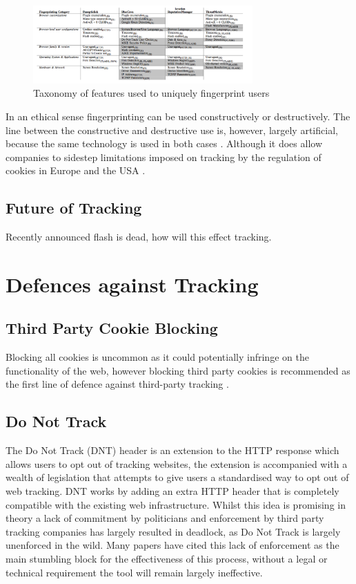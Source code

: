 \documentclass{article}
\begin{document}
\begin{figure}[H]
    \centering
    \includegraphics[width=0.75\textwidth]{fingerprintingConfigs}
    \caption{Taxonomy of features used to uniquely fingerprint users \parencite{cookielessMonster}}
    \label{fig:fingerprintingConfigs}
\end{figure}

In an ethical sense fingerprinting can be used constructively or destructively. The line between the constructive and destructive use is, however, largely artificial, because the same technology is used in both cases \parencite{cookielessMonster}. Although it does allow companies to sidestep limitations imposed on tracking by the regulation of cookies in Europe and the USA \parencite{dustingFP}. 

\subsection{Future of Tracking}
Recently announced flash is dead, how will this effect tracking. 

\section{Defences against Tracking}
\subsection{Third Party Cookie Blocking}
Blocking all cookies is uncommon as it could potentially infringe on the functionality of the web, however blocking third party cookies is recommended as the first line of defence against third-party tracking \parencite{roesner}. 


\subsection{Do Not Track}
The Do Not Track (DNT) header is an extension to the HTTP response which allows users to opt out of tracking websites, the extension is accompanied with a wealth of legislation that attempts to give users a standardised way to opt out of web tracking. DNT works by adding an extra HTTP header that is completely compatible with the existing web infrastructure. Whilst this idea is promising in theory a lack of commitment by politicians and enforcement by third party tracking companies has largely resulted in deadlock, as Do Not Track is largely unenforced in the wild. Many papers have cited this lack of enforcement as the main stumbling block for the effectiveness of this process, without a legal or technical requirement the tool will remain largely ineffective. \newline
\end{document}
